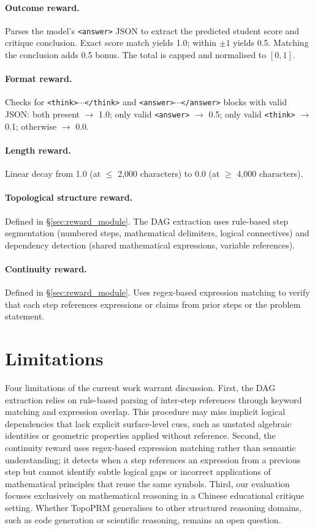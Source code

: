 \paragraph{Outcome reward.}
Parses the model's \texttt{<answer>} JSON to extract the predicted
student score and critique conclusion. Exact score match yields 1.0;
within $\pm 1$ yields 0.5. Matching the conclusion adds 0.5 bonus.
The total is capped and normalised to $[0, 1]$.

\paragraph{Format reward.}
Checks for \texttt{<think>$\cdots$</think>} and
\texttt{<answer>$\cdots$</answer>} blocks with valid JSON:
both present $\to$ 1.0; only valid \texttt{<answer>} $\to$ 0.5; only valid \texttt{<think>} $\to$ 0.1; otherwise $\to$ 0.0.

\paragraph{Length reward.}
Linear decay from 1.0 (at $\leq$ 2{,}000 characters) to 0.0 (at
$\geq$ 4{,}000 characters).

\paragraph{Topological structure reward.}
Defined in \S\ref{sec:reward_module}. The DAG extraction uses rule-based step
segmentation (numbered steps, mathematical delimiters, logical
connectives) and dependency detection (shared mathematical expressions,
variable references).

\paragraph{Continuity reward.}
Defined in \S\ref{sec:reward_module}. Uses regex-based expression matching
to verify that each step references expressions or claims from prior
steps or the problem statement.

\section{Limitations}
\label{app:limitations}

Four limitations of the current work warrant discussion. First, the DAG
extraction relies on rule-based parsing of inter-step references through
keyword matching and expression overlap. This procedure may miss implicit
logical dependencies that lack explicit surface-level cues, such as
unstated algebraic identities or geometric properties applied without
reference. Second, the continuity reward uses regex-based expression
matching rather than semantic understanding; it detects when a step
references an expression from a previous step but cannot identify subtle
logical gaps or incorrect applications of mathematical principles that
reuse the same symbols. Third, our evaluation focuses exclusively on
mathematical reasoning in a Chinese educational critique setting. Whether
TopoPRM generalises to other structured reasoning domains, such as code
generation or scientific reasoning, remains an open question.

